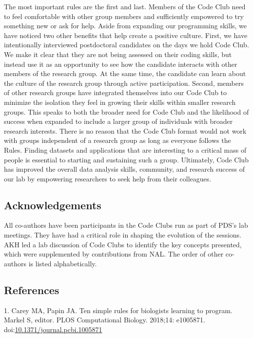 \documentclass[
  11pt,
]{article}
\begin{document}
The most important rules are the first and last. Members of the Code
Club need to feel comfortable with other group members and sufficiently
empowered to try something new or ask for help. Aside from expanding our
programming skills, we have noticed two other benefits that help create
a positive culture. First, we have intentionally interviewed
postdoctoral candidates on the days we hold Code Club. We make it clear
that they are not being assessed on their coding skills, but instead use
it as an opportunity to see how the candidate interacts with other
members of the research group. At the same time, the candidate can learn
about the culture of the research group through active participation.
Second, members of other research groups have integrated themselves into
our Code Club to minimize the isolation they feel in growing their
skills within smaller research groups. This speaks to both the broader
need for Code Club and the likelihood of success when expanded to
include a larger group of individuals with broader research interests.
There is no reason that the Code Club format would not work with groups
independent of a research group as long as everyone follows the Rules.
Finding datasets and applications that are interesting to a critical
mass of people is essential to starting and sustaining such a group.
Ultimately, Code Club has improved the overall data analysis skills,
community, and research success of our lab by empowering researchers to
seek help from their colleagues.

\hypertarget{acknowledgements}{%
\subsection{Acknowledgements}\label{acknowledgements}}

All co-authors have been participants in the Code Clubs run as part of
PDS's lab meetings. They have had a critical role in shaping the
evolution of the sessions. AKH led a lab discussion of Code Clubs to
identify the key concepts presented, which were supplemented by
contributions from NAL. The order of other co-authors is listed
alphabetically.

\newpage

\hypertarget{references}{%
\subsection{References}\label{references}}

\hypertarget{refs}{}
\leavevmode\hypertarget{ref-Carey2018}{}%
1. Carey MA, Papin JA. Ten simple rules for biologists learning to
program. Markel S, editor. PLOS Computational Biology. 2018;14:
e1005871.
doi:\href{https://doi.org/10.1371/journal.pcbi.1005871}{10.1371/journal.pcbi.1005871}
\end{document}
